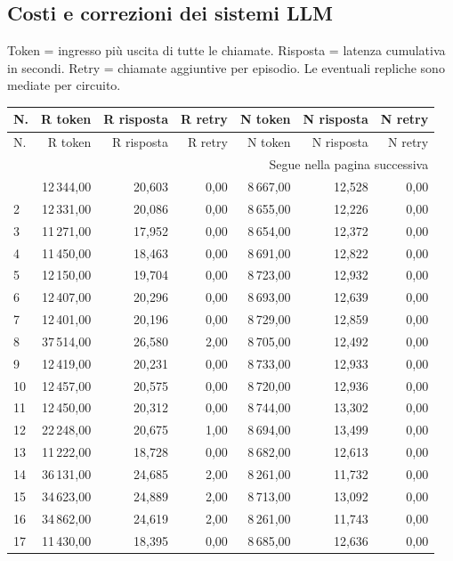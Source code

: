 \endgroup
\clearpage\subsection{Costi e correzioni dei sistemi LLM}
Token = ingresso più uscita di tutte le chiamate. Risposta = latenza cumulativa in secondi. Retry = chiamate aggiuntive per episodio. Le eventuali repliche sono mediate per circuito.
\begingroup\footnotesize
\setlength{\tabcolsep}{5pt}
\begin{longtable}{lrrrrrr}
\toprule
N. & R token & R risposta & R retry & N token & N risposta & N retry \\
\midrule
\endfirsthead
\toprule
N. & R token & R risposta & R retry & N token & N risposta & N retry \\
\midrule\endhead
\midrule\multicolumn{7}{r}{\footnotesize Segue nella pagina successiva}\\
\endfoot
\bottomrule\endlastfoot
1 & 12\,344,00 & 20,603 & 0,00 & 8\,667,00 & 12,528 & 0,00 \\
2 & 12\,331,00 & 20,086 & 0,00 & 8\,655,00 & 12,226 & 0,00 \\
3 & 11\,271,00 & 17,952 & 0,00 & 8\,654,00 & 12,372 & 0,00 \\
4 & 11\,450,00 & 18,463 & 0,00 & 8\,691,00 & 12,822 & 0,00 \\
5 & 12\,150,00 & 19,704 & 0,00 & 8\,723,00 & 12,932 & 0,00 \\
6 & 12\,407,00 & 20,296 & 0,00 & 8\,693,00 & 12,639 & 0,00 \\
7 & 12\,401,00 & 20,196 & 0,00 & 8\,729,00 & 12,859 & 0,00 \\
8 & 37\,514,00 & 26,580 & 2,00 & 8\,705,00 & 12,492 & 0,00 \\
9 & 12\,419,00 & 20,231 & 0,00 & 8\,733,00 & 12,933 & 0,00 \\
10 & 12\,457,00 & 20,575 & 0,00 & 8\,720,00 & 12,936 & 0,00 \\
11 & 12\,450,00 & 20,312 & 0,00 & 8\,744,00 & 13,302 & 0,00 \\
12 & 22\,248,00 & 20,675 & 1,00 & 8\,694,00 & 13,499 & 0,00 \\
13 & 11\,222,00 & 18,728 & 0,00 & 8\,682,00 & 12,613 & 0,00 \\
14 & 36\,131,00 & 24,685 & 2,00 & 8\,261,00 & 11,732 & 0,00 \\
15 & 34\,623,00 & 24,889 & 2,00 & 8\,713,00 & 13,092 & 0,00 \\
16 & 34\,862,00 & 24,619 & 2,00 & 8\,261,00 & 11,743 & 0,00 \\
17 & 11\,430,00 & 18,395 & 0,00 & 8\,685,00 & 12,636 & 0,00 \\

\end{longtable}
